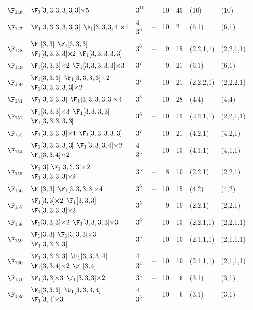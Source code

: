 \begin{landscape}
{\begin{longtable}{@{}l p{8.2cm} l l r r l l@{}}
$\F_{146}$ & $\F_{1}[3,3,3,3,3,3]{\times}5$ & $3^{10}$ & -- & 10 & 45 & (10) & (10) \\
$\F_{147}$ & $\F_{1}[3,3,3,3,3,3]$\; $\F_{1}[3,3,3,4]{\times}4$ & $4$\,$3^{6}$ & -- & 10 & 21 & (6,1) & (6,1) \\
$\F_{148}$ & $\F_{1}[3,3]$\; $\F_{1}[3,3,3]$\; $\F_{1}[3,3,3,3]{\times}2$\; $\F_{1}[3,3,3,3,3]$ & $3^{6}$ & -- & 9 & 15 & (2,2,1,1) & (2,2,1,1) \\
$\F_{149}$ & $\F_{1}[3,3,3]{\times}2$\; $\F_{1}[3,3,3,3,3]{\times}3$ & $3^{7}$ & -- & 9 & 21 & (6,1) & (6,1) \\
$\F_{150}$ & $\F_{1}[3,3,3]$\; $\F_{1}[3,3,3,3]{\times}2$\; $\F_{1}[3,3,3,3,3]{\times}2$ & $3^{7}$ & -- & 10 & 21 & (2,2,2,1) & (2,2,2,1) \\
$\F_{151}$ & $\F_{1}[3,3,3,3]$\; $\F_{1}[3,3,3,3,3]{\times}4$ & $3^{8}$ & -- & 10 & 28 & (4,4) & (4,4) \\
$\F_{152}$ & $\F_{1}[3,3,3]{\times}3$\; $\F_{1}[3,3,3,3]$\; $\F_{1}[3,3,3,3,3]$ & $3^{6}$ & -- & 10 & 15 & (2,2,1,1) & (2,2,1,1) \\
$\F_{153}$ & $\F_{1}[3,3,3,3]{\times}4$\; $\F_{1}[3,3,3,3,3]$ & $3^{7}$ & -- & 10 & 21 & (4,2,1) & (4,2,1) \\
$\F_{154}$ & $\F_{1}[3,3,3,3,3]$\; $\F_{1}[3,3,3,4]{\times}2$\; $\F_{1}[3,3,4]{\times}2$ & $4$\,$3^{5}$ & -- & 10 & 15 & (4,1,1) & (4,1,1) \\
$\F_{155}$ & $\F_{1}[3]$\; $\F_{1}[3,3,3]{\times}2$\; $\F_{1}[3,3,3,3]{\times}2$ & $3^{5}$ & -- & 8 & 10 & (2,2,1) & (2,2,1) \\
$\F_{156}$ & $\F_{1}[3,3]$\; $\F_{1}[3,3,3,3]{\times}4$ & $3^{6}$ & -- & 10 & 15 & (4,2) & (4,2) \\
$\F_{157}$ & $\F_{1}[3,3]{\times}2$\; $\F_{1}[3,3,3]$\; $\F_{1}[3,3,3,3]{\times}2$ & $3^{5}$ & -- & 9 & 10 & (2,2,1) & (2,2,1) \\
$\F_{158}$ & $\F_{1}[3,3,3]{\times}2$\; $\F_{1}[3,3,3,3]{\times}3$ & $3^{6}$ & -- & 10 & 15 & (2,2,1,1) & (2,2,1,1) \\
$\F_{159}$ & $\F_{1}[3,3]$\; $\F_{1}[3,3,3]{\times}3$\; $\F_{1}[3,3,3,3]$ & $3^{5}$ & -- & 10 & 10 & (2,1,1,1) & (2,1,1,1) \\
$\F_{160}$ & $\F_{1}[3,3,3,3]$\; $\F_{1}[3,3,3,4]$\; $\F_{1}[3,3,4]{\times}2$\; $\F_{1}[3,4]$ & $4$\,$3^{4}$ & -- & 10 & 10 & (2,1,1,1) & (2,1,1,1) \\
$\F_{161}$ & $\F_{1}[3,3]{\times}3$\; $\F_{1}[3,3,3]{\times}2$ & $3^{4}$ & -- & 10 & 6 & (3,1) & (3,1) \\
$\F_{162}$ & $\F_{1}[3,3,3]$\; $\F_{1}[3,3,3,4]$\; $\F_{1}[3,4]{\times}3$ & $4$\,$3^{3}$ & -- & 10 & 6 & (3,1) & (3,1) \\

\end{longtable}}
\end{landscape}
